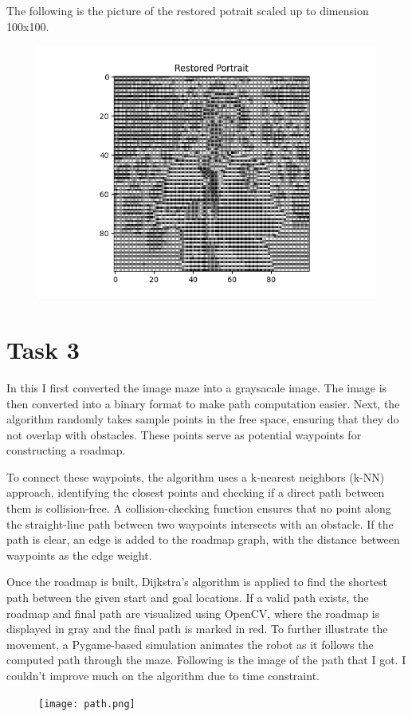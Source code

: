 \documentclass{article}
\begin{document}
The following is the picture of the restored potrait scaled up to dimension 100x100.
\begin{figure}[h!]
    \centering
    \includegraphics[width=1\linewidth]{Restored potrait.png}
\end{figure}

\section{Task 3}
In this I first converted the image maze into a graysacale image. The image is then converted into a binary format to make path computation easier. Next, the algorithm randomly takes sample points in the free space, ensuring that they do not overlap with obstacles. These points serve as potential waypoints for constructing a roadmap.

To connect these waypoints, the algorithm uses a k-nearest neighbors (k-NN) approach, identifying the closest points and checking if a direct path between them is collision-free. A collision-checking function ensures that no point along the straight-line path between two waypoints intersects with an obstacle. If the path is clear, an edge is added to the roadmap graph, with the distance between waypoints as the edge weight.

Once the roadmap is built, Dijkstra’s algorithm is applied to find the shortest path between the given start and goal locations. If a valid path exists, the roadmap and final path are visualized using OpenCV, where the roadmap is displayed in gray and the final path is marked in red. To further illustrate the movement, a Pygame-based simulation animates the robot as it follows the computed path through the maze.
Following is the image of the path that I got. I couldn't improve much on the algorithm due to time constraint.
\begin{figure}[h!]
    \centering
    \texttt{[image: path.png]}
\end{figure}

 
\end{document}
